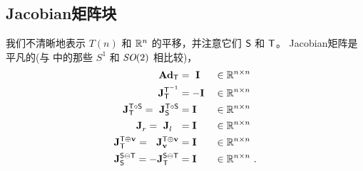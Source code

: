 \subsection{Jacobian矩阵块}

我们不清晰地表示 $T(n)$ 和 ${\mathbb R}^n$ 的平移，并注意它们 $\mathsf S$ 和 $\mathsf T$。
Jacobian矩阵是平凡的(与  中的那些 $S^1$ 和 $\textit{SO}(2)$ 相比较)，
%
\begin{align}
{\mathbf{Ad}_{\mathsf T}}            
  &= ~{\bf I} 
  &&\in{\mathbb R}^{n\times n} \\
{{\bf J}^{\mathsf T^{-1}}_{\mathsf T}} 
  &= -{\bf I} 
  &&\in{\mathbb R}^{n\times n} \\
{{\bf J}^{\mathsf T\circ\mathsf S}_{\mathsf T}} = ~{{\bf J}^{\mathsf T\circ\mathsf S}_{\mathsf S}} 
  &= {\bf I} 
  &&\in{\mathbb R}^{n\times n} \\
{{\bf J}^{}_{r}} = ~{{\bf J}^{}_{l}} ~~
  &= {\bf I} 
  &&\in{\mathbb R}^{n\times n} \\
{{\bf J}^{\mathsf T\oplus{\bf v}}_{\mathsf T}} = ~~{{\bf J}^{\mathsf T\oplus{\bf v}}_{{\bf v}}} 
  &= {\bf I} 
  &&\in{\mathbb R}^{n\times n} \\
{{\bf J}^{\mathsf S\ominus\mathsf T}_{\mathsf S}} = -{{\bf J}^{\mathsf S\ominus\mathsf T}_{\mathsf T}} 
  &= {\bf I} 
  &&\in{\mathbb R}^{n\times n} 
~.
\end{align}

